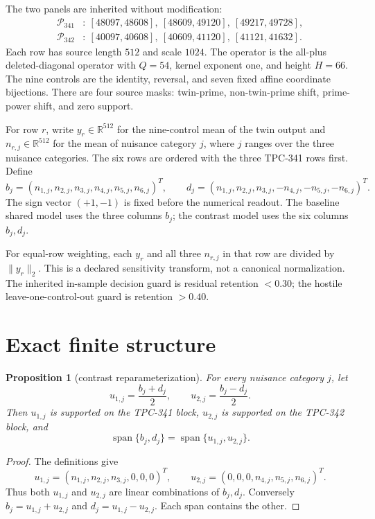 \documentclass[11pt]{article}
\newtheorem{proposition}{Proposition}
\newcommand{\norm}[1]{\lVert #1\rVert_2}
\newcommand{\R}{\mathbb{R}}
\begin{document}
The two panels are inherited without modification:
\begin{align*}
\mathcal P_{341}&:\ [48097,48608],\ [48609,49120],\
 [49217,49728],\\
\mathcal P_{342}&:\ [40097,40608],\ [40609,41120],\
 [41121,41632].
\end{align*}
Each row has source length $512$ and scale $1024$.  The operator is the
all-plus deleted-diagonal operator with $Q=54$, kernel exponent one, and
height $H=66$.  The nine controls are the identity, reversal, and seven fixed
affine coordinate bijections.  There are four source masks: twin-prime,
non-twin-prime shift, prime-power shift, and zero support.

For row $r$, write $y_r\in\R^{512}$ for the nine-control mean of the twin
output and $n_{r,j}\in\R^{512}$ for the mean of nuisance category $j$, where
$j$ ranges over the three nuisance categories.  The six rows are ordered with
the three TPC-341 rows first.  Define
\[
b_j=(n_{1,j},n_{2,j},n_{3,j},n_{4,j},n_{5,j},n_{6,j})^T,
\qquad
d_j=(n_{1,j},n_{2,j},n_{3,j},-n_{4,j},-n_{5,j},-n_{6,j})^T.
\]
The sign vector $(+1,-1)$ is fixed before the numerical readout.  The
baseline shared model uses the three columns $b_j$; the contrast model uses
the six columns $b_j,d_j$.

For equal-row weighting, each $y_r$ and all three $n_{r,j}$ in that row are
divided by $\norm{y_r}$.  This is a declared sensitivity transform, not a
canonical normalization.  The inherited in-sample decision guard is residual
retention $<0.30$; the hostile leave-one-control-out guard is retention
$>0.40$.

\section{Exact finite structure}

\begin{proposition}[contrast reparameterization]
\label{prop:contrast}
For every nuisance category $j$, let
\[
u_{1,j}=\frac{b_j+d_j}{2},\qquad
u_{2,j}=\frac{b_j-d_j}{2}.
\]
Then $u_{1,j}$ is supported on the TPC-341 block, $u_{2,j}$ is supported on
the TPC-342 block, and
\[
\operatorname{span}\{b_j,d_j\}
=\operatorname{span}\{u_{1,j},u_{2,j}\}.
\]
\end{proposition}

\begin{proof}
The definitions give
\[
u_{1,j}=(n_{1,j},n_{2,j},n_{3,j},0,0,0)^T,\qquad
u_{2,j}=(0,0,0,n_{4,j},n_{5,j},n_{6,j})^T.
\]
Thus both $u_{1,j}$ and $u_{2,j}$ are linear combinations of $b_j,d_j$.
Conversely $b_j=u_{1,j}+u_{2,j}$ and
$d_j=u_{1,j}-u_{2,j}$.  Each span contains the other.
\end{proof}
\end{document}
